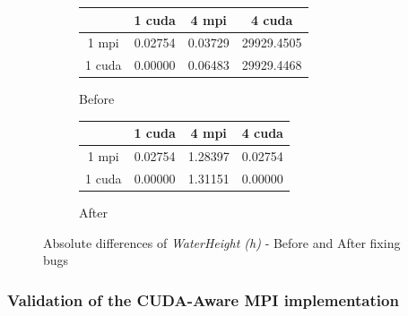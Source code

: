 \documentclass[article]{scrartcl}
\begin{document}
\begin{figure}[htpb]
  \centering
  \begin{subfigure}{.49\textwidth}
        \begin{tabular}{ |c|c|c|c|}
          \hline
                & 1 cuda      & 4 mpi  & 4 cuda \\
          \hline
          1 mpi & 0.02754     & 0.03729& 29929.4505 \\
          \hline
          1 cuda& 0.00000     & 0.06483& 29929.4468\\
          \hline
        \end{tabular}
    \caption{Before}
    \label{table:cuda_before}
  \end{subfigure}
%
    \begin{subfigure}{.49\textwidth}
    \centering
        \begin{tabular}{ |c|c|c|c|}
          \hline
                & 1 cuda      & 4 mpi  & 4 cuda \\
          \hline
          1 mpi & 0.02754     & 1.28397& 0.02754 \\
          \hline
          1 cuda& 0.00000     & 1.31151& 0.00000\\
          \hline
        \end{tabular}
    \caption{After}
    \label{table:cuda_after}
    \end{subfigure}

    \caption{Absolute differences of \textit{WaterHeight (h)} - Before and After fixing bugs}
    \label{table:cuda}
\end{figure}

\subsubsection{Validation of the CUDA-Aware MPI implementation}
\end{document}
